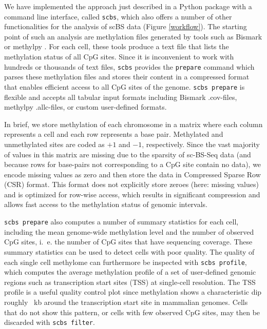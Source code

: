 \documentclass[twocolumn,10pt]{article}
\begin{document}
We have implemented the approach just described in a Python package with a command line interface, called \texttt{scbs}, which also offers a number of other functionalities for the analysis of scBS data (Figure \ref{workflow}). The starting point of such an analysis are methylation files generated by tools such as Bismark \citep{bismark} or methylpy \citep{methylpy}. For each cell, these tools produce a text file that lists the methylation status of all CpG sites. Since it is inconvenient to work with hundreds or thousands of text files, \texttt{scbs} provides the \texttt{prepare} command which parses these methylation files and stores their content in a compressed format that enables efficient access to all CpG sites of the genome. \texttt{scbs prepare} is flexible and accepts all tabular input formats including Bismark .cov-files, methylpy .allc-files, or custom user-defined formats.

In brief, we store methylation of each chromosome in a matrix where each column represents a cell and each row represents a base pair. Methylated and unmethylated sites are coded as $+1$ and $-1$, respectively. Since the vast majority of values in this matrix are missing due to the sparsity of sc-BS-Seq data (and because rows for base-pairs not corresponding to a CpG site contain no data), we encode missing values as zero and then store the data in Compressed Sparse Row (CSR) format. This format does not explicitly store zeroes (here: missing values) and is optimized for row-wise access, which results in significant compression and allows fast access to the methylation status of genomic intervals.

\texttt{scbs prepare} also computes a number of summary statistics for each cell, including the mean genome-wide methylation level and the number of observed CpG sites, i.~e. the number of CpG sites that have sequencing coverage. These summary statistics can be used to detect cells with poor quality. The quality of each single cell methylome can furthermore be inspected with \texttt{scbs profile}, which computes the average methylation profile of a set of user-defined genomic regions such as transcription start sites (TSS) at single-cell resolution. The TSS profile is a useful quality control plot since methylation shows a characteristic dip roughly ~kb around the transcription start site in mammalian genomes. Cells that do not show this pattern, or cells with few observed CpG sites, may then be discarded with \texttt{scbs filter}. 
\end{document}
